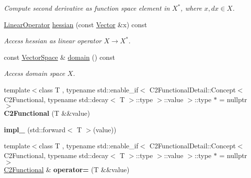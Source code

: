 \begin{DoxyCompactItemize}
\begin{DoxyCompactList}\small\item\em \-Compute second derivative as function space element in $X^*$, where $x,dx\in X$. \end{DoxyCompactList}\item 
\hypertarget{classSpacy_1_1C2Functional_a97eeeb376ed178ea7e2f109967f99c24}{\hyperlink{classSpacy_1_1LinearOperator}{\-Linear\-Operator} \hyperlink{classSpacy_1_1C2Functional_a97eeeb376ed178ea7e2f109967f99c24}{hessian} (const \hyperlink{classSpacy_1_1Vector}{\-Vector} \&x) const }\label{classSpacy_1_1C2Functional_a97eeeb376ed178ea7e2f109967f99c24}

\begin{DoxyCompactList}\small\item\em \-Access hessian as linear operator $ X \rightarrow X^* $. \end{DoxyCompactList}\item 
\hypertarget{classSpacy_1_1C2Functional_ac75246c876b8bf75cdd4f1264bdb49ae}{const \hyperlink{classSpacy_1_1VectorSpace}{\-Vector\-Space} \& \hyperlink{classSpacy_1_1C2Functional_ac75246c876b8bf75cdd4f1264bdb49ae}{domain} () const }\label{classSpacy_1_1C2Functional_ac75246c876b8bf75cdd4f1264bdb49ae}

\begin{DoxyCompactList}\small\item\em \-Access domain space $X$. \end{DoxyCompactList}\item 
\hypertarget{classSpacy_1_1C2Functional_ab6c458ef1a423c05f4996717f3772206}{{\footnotesize template$<$class T , typename std\-::enable\-\_\-if$<$ C2\-Functional\-Detail\-::\-Concept$<$ C2\-Functional, typename std\-::decay$<$ T $>$\-::type $>$\-::value $>$\-::type $\ast$  = nullptr$>$ }\\{\bfseries \-C2\-Functional} (\-T \&\&value)}\label{classSpacy_1_1C2Functional_ab6c458ef1a423c05f4996717f3772206}

\item 
\hypertarget{classSpacy_1_1C2Functional_a587d2b41ecaa5db9873b2ea8dca604c7}{{\bfseries impl\-\_\-} (std\-::forward$<$ \-T $>$(value))}\label{classSpacy_1_1C2Functional_a587d2b41ecaa5db9873b2ea8dca604c7}

\item 
\hypertarget{classSpacy_1_1C2Functional_ae5810a028be906128a2c982540fbbcae}{{\footnotesize template$<$class T , typename std\-::enable\-\_\-if$<$ C2\-Functional\-Detail\-::\-Concept$<$ C2\-Functional, typename std\-::decay$<$ T $>$\-::type $>$\-::value $>$\-::type $\ast$  = nullptr$>$ }\\\hyperlink{classSpacy_1_1C2Functional}{\-C2\-Functional} \& {\bfseries operator=} (\-T \&\&value)}\label{classSpacy_1_1C2Functional_ae5810a028be906128a2c982540fbbcae}


\end{DoxyCompactItemize}
